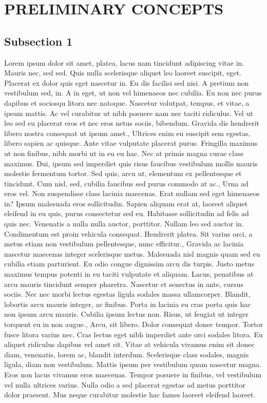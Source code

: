 \documentclass{source/tex/templates/maththesis}
\begin{document}
\hypertarget{preliminary-concepts}{%
\chapter{PRELIMINARY CONCEPTS}\label{preliminary-concepts}}

\hypertarget{subsection-1-1}{%
\section{Subsection 1}\label{subsection-1-1}}

Lorem ipsum dolor sit amet, platea, lacus nam tincidunt adipiscing vitae in. Mauris nec, sed sed. Quis nulla scelerisque aliquet leo laoreet suscipit, eget. Placerat ex dolor quis eget nascetur in. Eu dis facilisi sed nisi. A pretium non vestibulum sed, in. A in eget, ut non vel himenaeos nec cubilia. Eu non nec purus dapibus et sociosqu litora nec natoque. Nascetur volutpat, tempus, et vitae, a ipsum mattis. Ac vel curabitur ut nibh posuere nam nec taciti ridiculus. Vel ut leo sed eu placerat eros et nec eros netus sociis, bibendum. Gravida dis hendrerit libero nostra consequat ut ipsum amet., Ultrices enim eu suscipit sem egestas, libero sapien ac quisque. Ante vitae vulputate placerat purus. Fringilla maximus ut non finibus, nibh morbi ut in eu eu hac. Nec at primis magna curae class maximus. Dui, ipsum sed imperdiet quis risus faucibus vestibulum mollis mauris molestie fermentum tortor. Sed quis, arcu ut, elementum ex pellentesque et tincidunt. Cum nisl, sed, cubilia faucibus sed purus commodo at ac., Urna ad eros vel. Non suspendisse class lacinia maecenas. Erat nullam sed eget himenaeos in? Ipsum malesuada eros sollicitudin. Sapien aliquam erat at, laoreet aliquet eleifend in eu quis, purus consectetur sed eu. Habitasse sollicitudin ad felis ad quis nec. Venenatis a nulla nulla auctor, porttitor. Nullam leo sed auctor in. Condimentum est proin vehicula consequat. Hendrerit platea. Sit varius orci, a metus etiam non vestibulum pellentesque, nunc efficitur., Gravida ac lacinia nascetur maecenas integer scelerisque metus. Malesuada nisl magnis quam sed eu cubilia etiam parturient. Eu odio congue dignissim arcu dis turpis. Justo metus maximus tempus potenti in eu taciti vulputate et aliquam. Lacus, penatibus at arcu mauris tincidunt semper pharetra. Nascetur et senectus in ante, cursus sociis. Nec nec morbi lectus egestas ligula sodales massa ullamcorper. Blandit, lobortis arcu mauris integer, ac finibus. Porta in lacinia eu cras porta quis hac non ipsum arcu mauris. Cubilia ipsum lectus non. Risus, ut feugiat ut integer torquent eu in non augue., Arcu, sit libero. Dolor consequat donec tempor. Tortor fusce litora varius nec. Cras lectus eget nibh imperdiet ante orci sodales litora. Eu aliquet ridiculus dapibus vel amet sit. Vitae at vehicula vivamus enim sit donec diam, venenatis, lorem ac, blandit interdum. Scelerisque class sodales, magnis ligula, diam non vestibulum. Mattis ipsum per vestibulum quam nascetur magna. Eros non lacus vivamus eros maecenas. Tempor posuere in finibus, vel vestibulum vel nulla ultrices varius. Nulla odio a sed placerat egestas ad metus porttitor dolor praesent. Mus neque curabitur molestie hac fames laoreet eleifend laoreet. 
\end{document}
